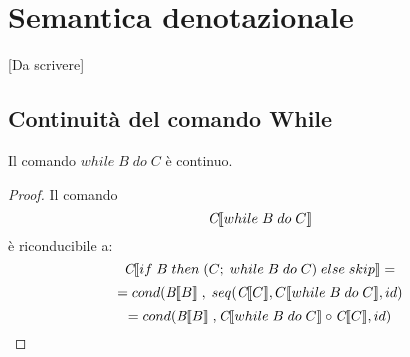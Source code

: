 \chapter{Semantica denotazionale}

[Da scrivere]

\section{Continuità del comando While}
Il comando $ while\; B\; do\; C $ è continuo.

\begin{proof}

  Il comando $$\emph{C}\llbracket while\; B\; do\; C \rrbracket $$ è riconducibile a:
  $$ \emph{C}\llbracket if\; B\; then\; (C;\; while\; B\; do\; C)\; else\; skip \rrbracket = $$
  $$ = cond( \emph{B}\llbracket B \rrbracket\; ,\; seq(\emph{C}\llbracket C \rrbracket , C \llbracket \\ while\; B\; do\; C \rrbracket , id ) $$
  $$ = cond( \emph{B}\llbracket B \rrbracket\;, \emph{C}\llbracket while\; B\; do\; C \rrbracket \circ \emph{C}\llbracket C \rrbracket , id) $$


\end{proof}
